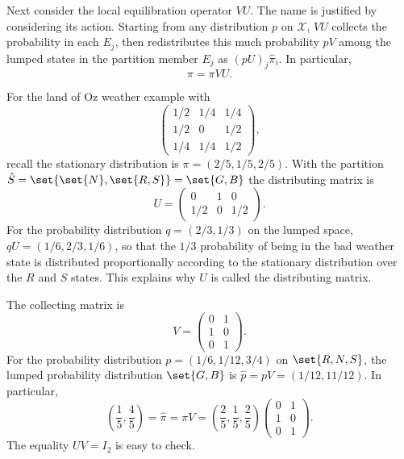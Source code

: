 \documentclass[12pt]{article}
\begin{document}
Next consider the local equilibration operator \( VU \).  The name is
justified by considering its action.  Starting from any distribution \(
p \) on \( \mathcal{X} \), \( VU \) collects the probability in each \(
E_j \), then redistributes this much probability \( pV \) among the
lumped states in the partition member \( E_j \) as \( (pU)_j \hat{\pi}_i
\).  In particular,
\[
    \pi = \pi VU.
\]

\begin{example}
    For the land of Oz weather example with
    \[
        \begin{pmatrix}
            1/2 & 1/4 & 1/4 \\
            1/2 & 0 & 1/2 \\
            1/4 & 1/4 & 1/2
        \end{pmatrix}
        ,
    \] recall the stationary distribution is \( \pi = (2/5, 1/5, 2/5) \).
    With the partition \( \hat{S} = \set{ \set{N}, \set{R,S}} =\set{G, B}
    \) the distributing matrix is
    \[
        U =
        \begin{pmatrix}
            0 & 1 & 0 \\
            1/2 & 0 & 1/2
        \end{pmatrix}
        .
    \] For the probability distribution \( q = (2/3, 1/3) \) on the
    lumped space, \( qU = (1/6, 2/3, 1/6) \), so that the \( 1/3 \)
    probability of being in the bad weather state is distributed
    proportionally according to the stationary distribution over the \(
    R \) and \( S \) states.  This explains why \( U \) is called the
    distributing matrix.

    The collecting matrix is
    \[
        V=
        \begin{pmatrix}
            0 & 1 \\
            1 & 0 \\
            0 & 1
        \end{pmatrix}
        .
    \] For the probability distribution \( p = (1/6, 1/12, 3/4) \) on \(
    \set{R,N,S} \), the lumped probability distribution \( \set{G, B} \)
    is \( \hat{p} = pV = (1/12, 11/12) \).  In particular,
    \[
        \left( \frac{1}{5}, \frac{4}{5} \right) = \hat{\pi} = \pi V =
        \left( \frac{2}{5}, \frac{1}{5}, \frac{2}{5} \right)
        \begin{pmatrix}
            0 & 1 \\
            1 & 0 \\
            0 & 1
        \end{pmatrix}
        .
    \] The equality \( UV = I_2 \) is easy to check.


\end{example}
\end{document}
